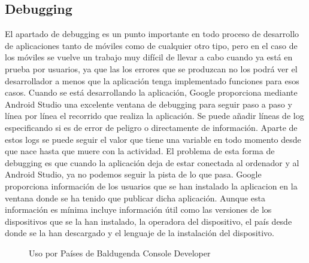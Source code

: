 \subsection{Debugging}
\label{subsecc:Debugging}

El apartado de debugging es un punto importante en todo proceso de desarrollo de aplicaciones tanto de móviles como de cualquier otro tipo, pero en el caso de los móviles se vuelve un trabajo muy difícil de llevar a cabo cuando ya está en prueba por usuarios, ya que las los errores que se produzcan no los podrá ver el desarrollador a menos que la aplicación tenga implementado funciones para esos casos.
Cuando se está desarrollando la aplicación, Google proporciona mediante Android Studio una excelente ventana de debugging para seguir paso a paso y  línea por línea el recorrido que realiza la aplicación.
Se puede añadir líneas de log especificando si es de error de peligro o directamente de información. Aparte de estos logs se puede seguir el valor que tiene una variable en todo momento desde que nace hasta que muere con la actividad.
El problema de esta forma de debugging es que cuando la aplicación deja de estar conectada al ordenador y al Android Studio, ya no podemos seguir la pista de lo que pasa.
Google proporciona información de los usuarios que se han instalado la aplicacion en la ventana donde se ha tenido que publicar dicha aplicación. Aunque esta información es mínima incluye información útil como las versiones de los dispositivos que se la han instalado, la operadora del dispositivo, el país desde donde se la han descargado y el lenguaje de la instalación del dispositivo.
\newpage
\begin{figure}[H] 
  \begin{center} 
    \caption{Uso por Países de Baldugenda Console Developer} 
    \label{fig:UsoPorPaises} 
  \end{center} 
\end{figure}

